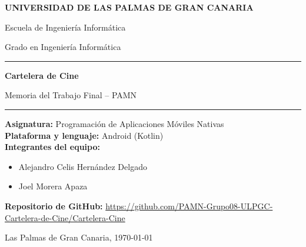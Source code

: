 \documentclass[11pt,a4paper]{article}
\begin{document}
\begin{titlepage}
    \centering
    \vspace*{1.5cm}
    {\Large\textbf{UNIVERSIDAD DE LAS PALMAS DE GRAN CANARIA}\par}
    \vspace{0.3cm}
    {\large Escuela de Ingeniería Informática\par}
    \vspace{0.2cm}
    {\normalsize Grado en Ingeniería Informática\par}

    \vspace{2.5cm}
    {\color{ulpgcblue}\rule{\linewidth}{1.5pt}\par}
    \vspace{0.4cm}
    {\Huge\bfseries\textcolor{ulpgcblue}{Cartelera de Cine}\par}
    \vspace{0.3cm}
    {\Large Memoria del Trabajo Final -- PAMN\par}
    \vspace{0.2cm}
    {\color{ulpgcblue}\rule{\linewidth}{1.5pt}\par}

    \vspace{2cm}
    \begin{flushleft}
        \textbf{Asignatura:} Programación de Aplicaciones Móviles Nativas\\
        \textbf{Plataforma y lenguaje:} Android (Kotlin)\\[0.4cm]
        \textbf{Integrantes del equipo:}
        \begin{itemize}[leftmargin=1.5cm]
            \item Alejandro Celis Hernández Delgado
            \item Joel Morera Apaza
        \end{itemize}
        \vspace{0.4cm}
        \textbf{Repositorio de GitHub:} \url{https://github.com/PAMN-Grupo08-ULPGC-Cartelera-de-Cine/Cartelera-Cine}\\
    \end{flushleft}

    \vfill
    {\large Las Palmas de Gran Canaria, \today\par}
\end{titlepage}

\tableofcontents
\newpage
\end{document}
